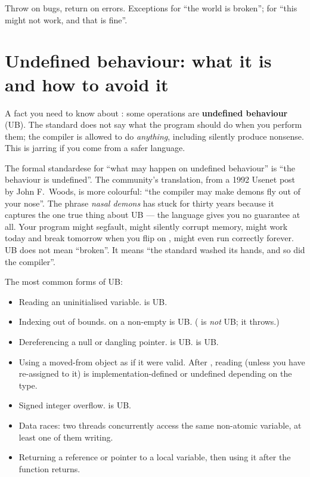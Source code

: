 \begin{idea}
Throw on bugs, return on errors. Exceptions for ``the world is
broken'';  for ``this might not work, and that
is fine''.
\end{idea}

\section{Undefined behaviour: what it is and how to avoid it}
\label{sec:cpp:ub}

A fact you need to know about \cpp{}: some operations are
\textbf{undefined behaviour} (UB). The standard does not say what
the program should do when you perform them; the compiler is
allowed to do \emph{anything}, including silently produce nonsense.
This is jarring if you come from a safer language.

\begin{funfact}
The formal standardese for ``what may happen on undefined behaviour''
is ``the behaviour is undefined''. The community's translation, from
a 1992 Usenet post by John F.\ Woods, is more colourful: ``the
compiler may make demons fly out of your nose''. The phrase
\emph{nasal demons} has stuck for thirty years because it captures
the one true thing about UB --- the language gives you no guarantee
at all. Your program might segfault, might silently corrupt memory,
might work today and break tomorrow when you flip on ,
might even run correctly forever. UB does not mean ``broken''. It
means ``the standard washed its hands, and so did the compiler''.
\end{funfact}


The most common forms of UB:

\begin{itemize}[leftmargin=*]
  \item Reading an uninitialised variable. 
    is UB.
  \item Indexing out of bounds.  on a non-empty
     is UB. ( is \emph{not} UB; it
    throws.)
  \item Dereferencing a null or dangling pointer.  is UB.  is UB.
  \item Using a moved-from object as if it were valid. After
    , reading  (unless you
    have re-assigned to it) is implementation-defined or undefined
    depending on the type.
  \item Signed integer overflow.  is UB.
  \item Data races: two threads concurrently access the same
    non-atomic variable, at least one of them writing.
  \item Returning a reference or pointer to a local variable, then
    using it after the function returns.
\end{itemize}


